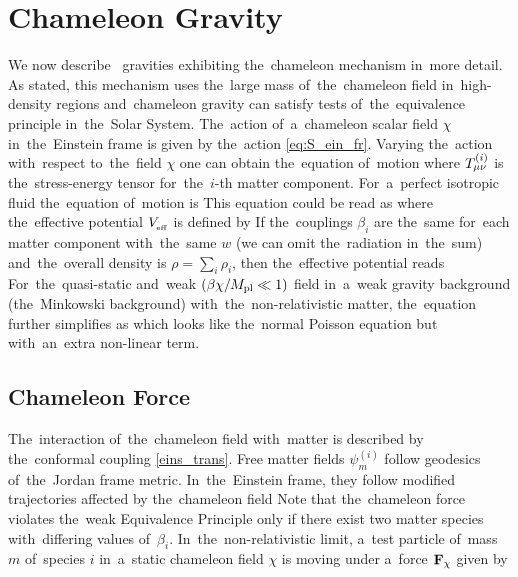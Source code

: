 \section{Chameleon Gravity}
\label{sec_cham}
We now describe \fR\ gravities exhibiting the~chameleon mechanism in~more detail. As stated, this mechanism uses the~large mass of~the~chameleon field in~high-density regions and~chameleon gravity can satisfy tests of~the~equivalence principle in~the~Solar System. The~action of~a~chameleon scalar field $\chi$ in~the~Einstein frame is given by the~action \eqref{eq:S_ein_fr}. Varying the~action with~respect to~the~field $\chi$ one can obtain the~equation of~motion
where $T^{(i)}_{\mu\nu}$ is the~stress-energy tensor for~the~$i$-th matter component. For~a~perfect isotropic fluid the~equation of~motion is
This equation could be read as
where the~effective potential $V_{_\text{\tiny eff}}$ is defined by
If the~couplings $\beta_i$ are the~same for~each matter component with~the~same $w$ (we can omit the~radiation in~the~sum) and~the~overall density is $\rho=\sum_i\rho_i$, then the~effective potential reads
For~the~quasi-static and~weak $(\beta\chi/M_{\text{\scriptsize pl}}\ll1)$ field in~a~weak gravity background (the~Minkowski background) with~the~non-relativistic matter, the~equation further simplifies as
which looks like the~normal Poisson equation but with~an~extra non-linear term.
\subsection{Chameleon Force}
The~interaction of~the~chameleon field with~matter is described by the~conformal coupling \eqref{eins_trans}. Free matter fields $\psi_m^{(i)}$ follow geodesics of~the~Jordan frame metric. In~the~Einstein frame, they follow modified trajectories affected by the~chameleon field \parencite{Waterhouse:2006wv}
Note that the~chameleon force violates the~weak Equivalence Principle only if there exist two matter species with~differing values of~$\beta_i$. In~the~non-relativistic limit, a~test particle of~mass $m$ of~species $i$ in~a~static chameleon field $\chi$ is moving under a~force $\mathbf{F}_\chi$ given by
